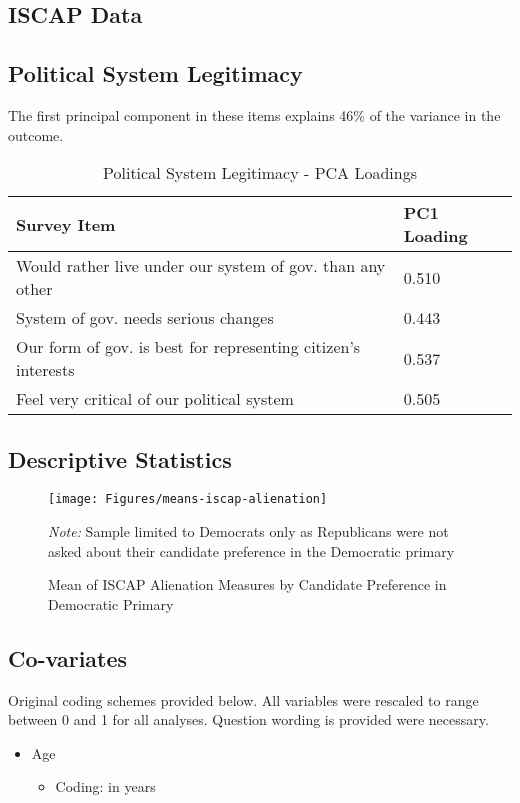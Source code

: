 \documentclass[12pt]{article}
\begin{document}
\begin{appendices}
\begin{refsection}


\section{ISCAP Data}
\subsection{Political System Legitimacy}\label{app:legitimacy}
The first principal component in these items explains 46\% of the variance in the outcome. 

\begin{table}[ht!]
\caption{Political System Legitimacy - PCA Loadings}
\begin{center}
\label{table:principalcomponent}
\begin{tabular}{ll}
\hline
Survey Item                                & PC1 Loading \\ \hline
Would rather live under our system of gov. than any other & 0.510\\
System of gov. needs serious changes & 0.443\\
Our form of gov. is best for representing citizen's interests & 0.537\\
Feel very critical of our political system & 0.505\\
\hline
\end{tabular}
\end{center}
\end{table}


\subsection{Descriptive Statistics}\label{app:desc}
\begin{figure}[h!]
	\centering
	\texttt{[image: Figures/means-iscap-alienation]}	
	\caption{Mean of ISCAP Alienation Measures by Candidate Preference in Democratic Primary}\label{fig:iscap-alienation-means}
	\vspace{-0.25cm}
	{\scriptsize \textit{Note:} Sample limited to Democrats only as Republicans were not asked about their candidate preference in the Democratic primary}
\end{figure}

\subsection{Co-variates}
\singlespacing
Original coding schemes provided below. All variables were rescaled to range between 0 and 1 for all analyses. Question wording is provided were necessary.
\begin{itemize}
	\item Age
		\begin{itemize}
			\item Coding: in years
		\end{itemize}
		

\end{itemize}
\end{refsection}
\end{appendices}
\end{document}
